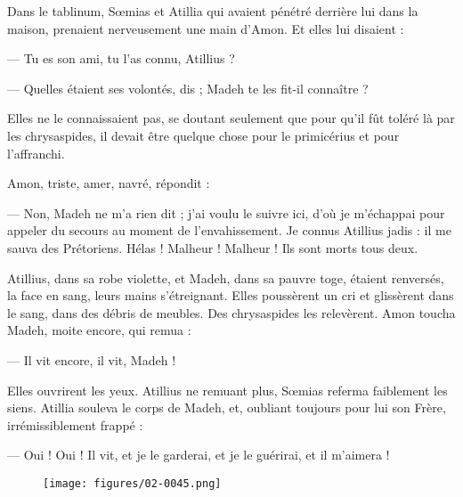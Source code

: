 \documentclass[a4paper, 11pt, oneside, polutonikogreek, french]{article}
\begin{document}
Dans le tablinum, Sœmias et Atillia qui avaient pénétré derrière lui dans la maison, prenaient nerveusement une main d'Amon. Et elles lui disaient :

--- Tu es son ami, tu l'as connu, Atillius ?

--- Quelles étaient ses volontés, dis ; Madeh te les fit-il connaître ?

Elles ne le connaissaient pas, se doutant seulement que pour qu'il fût toléré là par les chrysaspides, il devait être quelque chose pour le primicérius et pour l'affranchi.

Amon, triste, amer, navré, répondit :

--- Non, Madeh ne m'a rien dit ; j'ai voulu le suivre ici, d'où je m'échappai pour appeler du secours au moment de l'envahissement. Je connus Atillius jadis : il me sauva des Prétoriens. Hélas ! Malheur ! Malheur ! Ils sont morts tous deux.

Atillius, dans sa robe violette, et Madeh, dans sa pauvre toge, étaient renversés, la face en sang, leurs mains s'étreignant. Elles poussèrent un cri et glissèrent dans le sang, dans des débris de meubles. Des chrysaspides les relevèrent. Amon toucha Madeh, moite encore, qui remua :

--- Il vit encore, il vit, Madeh !

Elles ouvrirent les yeux. Atillius ne remuant plus, Sœmias referma faiblement les siens. Atillia souleva le corps de Madeh, et, oubliant toujours pour lui son Frère, irrémissiblement frappé :

--- Oui ! Oui ! Il vit, et je le garderai, et je le guérirai, et il m'aimera !
\begin{figure}[H]
\centering
\texttt{[image: figures/02-0045.png]}
\end{figure}
\clearpage
\subsection{}
\end{document}

